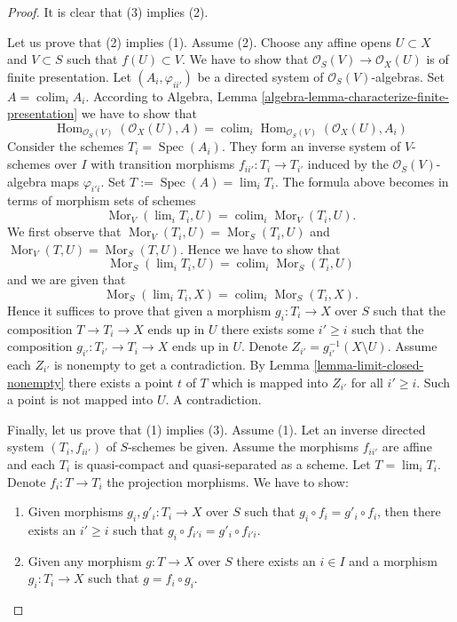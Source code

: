 \documentclass{stacks-project}
\theoremstyle{plain}
\theoremstyle{definition}
\theoremstyle{remark}
\numberwithin{equation}{subsection}
\def\lim{\mathop{\mathrm{lim}}\nolimits}
\def\colim{\mathop{\mathrm{colim}}\nolimits}
\def\Spec{\mathop{\mathrm{Spec}}}
\def\Hom{\mathop{\mathrm{Hom}}\nolimits}
\def\Mor{\mathop{\mathrm{Mor}}\nolimits}
\begin{document}
\begin{proof}
It is clear that (3) implies (2).

\medskip\noindent
Let us prove that (2) implies (1). Assume (2).
Choose any affine opens $U \subset X$ and $V \subset S$ such that
$f(U) \subset V$. We have to show that
$\mathcal{O}_S(V) \to \mathcal{O}_X(U)$ is of finite presentation.
Let $(A_i, \varphi_{ii'})$ be a directed system of
$\mathcal{O}_S(V)$-algebras. Set $A = \colim_i A_i$.
According to
Algebra, Lemma \ref{algebra-lemma-characterize-finite-presentation}
we have to show that
$$
\Hom_{\mathcal{O}_S(V)}(\mathcal{O}_X(U), A) =
\colim_i \Hom_{\mathcal{O}_S(V)}(\mathcal{O}_X(U), A_i)
$$
Consider the schemes $T_i = \Spec(A_i)$. They
form an inverse system of $V$-schemes over $I$
with transition morphisms $f_{ii'} : T_i \to T_{i'}$
induced by the $\mathcal{O}_S(V)$-algebra maps $\varphi_{i'i}$.
Set $T := \Spec(A) = \lim_i T_i$.
The formula above becomes in terms of morphism sets of schemes
$$
\Mor_V(\lim_i T_i, U) =
\colim_i \Mor_V(T_i, U).
$$
We first observe that
$\Mor_V(T_i, U) = \Mor_S(T_i, U)$
and
$\Mor_V(T, U) = \Mor_S(T, U)$.
Hence we have to show that
$$
\Mor_S(\lim_i T_i, U) =
\colim_i \Mor_S(T_i, U)
$$
and we are given that
$$
\Mor_S(\lim_i T_i, X) =
\colim_i \Mor_S(T_i, X).
$$
Hence it suffices to prove that given a morphism $g_i : T_i \to X$ over $S$
such that the composition $T \to T_i \to X$ ends up in $U$ there exists some
$i' \geq i$ such that the composition $g_{i'} : T_{i'} \to T_i \to X$ ends up
in $U$. Denote $Z_{i'} = g_{i'}^{-1}(X \setminus U)$.
Assume each $Z_{i'}$ is nonempty
to get a contradiction. By Lemma \ref{lemma-limit-closed-nonempty}
there exists a point $t$ of $T$ which is mapped into $Z_{i'}$ for all
$i' \geq i$. Such a point is not mapped into $U$. A contradiction.

\medskip\noindent
Finally, let us prove that (1) implies (3). Assume (1). Let an inverse directed
system $(T_i, f_{ii'})$ of $S$-schemes be given. Assume the morphisms $f_{ii'}$
are affine and each $T_i$ is quasi-compact and quasi-separated as a scheme. Let
$T = \lim_i T_i$. Denote $f_i : T \to T_i$ the projection morphisms.
We have to show:
\begin{enumerate}
\item[(a)] Given morphisms $g_i, g'_i : T_i \to X$ over $S$ such that
$g_i \circ f_i = g'_i \circ f_i$, then there exists an $i' \geq i$
such that $g_i \circ f_{i'i} = g'_i \circ f_{i'i}$.
\item[(b)] Given any morphism
$g : T \to X$ over $S$ there exists an $i \in I$ and a morphism
$g_i : T_i \to X$ such that $g = f_i \circ g_i$.
\end{enumerate}


\end{proof}
\end{document}
